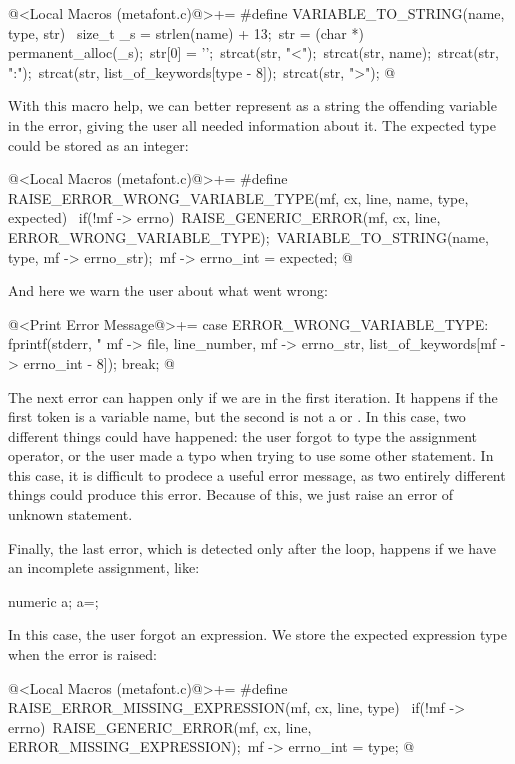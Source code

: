 \iniciocodigo
@<Local Macros (metafont.c)@>+=
#define VARIABLE_TO_STRING(name, type, str) {\
  size_t _s = strlen(name) + 13;\
  str = (char *) permanent_alloc(_s);\
  str[0] = '\0';\
  strcat(str, "<");\
  strcat(str, name);\
  strcat(str, ":");\
  strcat(str, list_of_keywords[type - 8]);\
  strcat(str, ">");}
@
\fimcodigo

With this macro help, we can better represent as a string the
offending variable in the error, giving the user all needed
information about it. The expected type could be stored as an integer:

\iniciocodigo
@<Local Macros (metafont.c)@>+=
#define RAISE_ERROR_WRONG_VARIABLE_TYPE(mf, cx, line, name, type, expected) {\
  if(!mf -> errno){\
    RAISE_GENERIC_ERROR(mf, cx, line, ERROR_WRONG_VARIABLE_TYPE);\
    VARIABLE_TO_STRING(name, type, mf -> errno_str);\
    mf -> errno_int = expected;}}
@
\fimcodigo

And here we warn the user about what went wrong:

\iniciocodigo
@<Print Error Message@>+=
case ERROR_WRONG_VARIABLE_TYPE:
  fprintf(stderr, "%
          mf -> file, line_number, mf -> errno_str,
          list_of_keywords[mf -> errno_int - 8]);
  break;
@
\fimcodigo

The next error can happen only if we are in the first iteration. It
happens if the first token is a variable name, but the second is not
a \monoespaco{=} or \monoespaco{:=}. In this case, two different
things could have happened: the user forgot to type the assignment
operator, or the user made a typo when trying to use some other
statement. In this case, it is difficult to prodece a useful error
message, as two entirely different things could produce this
error. Because of this, we just raise an error of unknown statement.

Finally, the last error, which is detected only after the loop,
happens if we have an incomplete assignment, like:

\alinhaverbatim
numeric a;
a=;
\alinhanormal

In this case, the user forgot an expression. We store the expected
expression type when the error is raised:

\iniciocodigo
@<Local Macros (metafont.c)@>+=
#define RAISE_ERROR_MISSING_EXPRESSION(mf, cx, line, type) {\
  if(!mf -> errno){\
    RAISE_GENERIC_ERROR(mf, cx, line, ERROR_MISSING_EXPRESSION);\
    mf -> errno_int = type;}}
@
\fimcodigo

